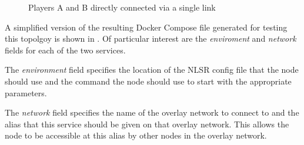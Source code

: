\begin{appendices}
\begin{figure}[H]
    \centering
    \caption{Players A and B directly connected via a single link}
    \label{fig:app:docker-l2}
\end{figure}

A simplified version of the resulting Docker Compose file generated for testing this topolgoy is shown in . Of particular interest are the \textit{enviroment} and \textit{network} fields for each of the two services. 

The \textit{environment} field specifies the location of the NLSR config file that the node should use and the command the node should use to start \game{} with the appropriate parameters.

The \textit{network} field specifies the name of the overlay network to connect to and the alias that this service should be given on that overlay network. This allows the node to be accessible at this alias by other nodes in the overlay network.







\end{appendices}